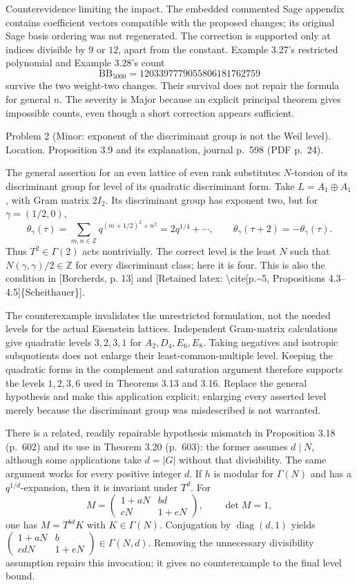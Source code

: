 \documentclass[10pt]{article}
\begin{document}
Counterevidence limiting the impact. The embedded commented Sage appendix contains coefficient vectors compatible with the proposed changes; its original Sage basis ordering was not regenerated. The correction is supported only at indices divisible by \(9\) or \(12\), apart from the constant. Example 3.27’s restricted polynomial and Example 3.28’s count \[\mathrm{BB}_{5000}=1203397779055806181762759\] survive the two weight-two changes. Their survival does not repair the formula for general \(n\). The severity is Major because an explicit principal theorem gives impossible counts, even though a short correction appears sufficient.\par
Problem 2 (Minor: exponent of the discriminant group is not the Weil level).  Location. Proposition 3.9 and its explanation, journal p. 598 (PDF p. 24).\par
The general assertion for an even lattice of even rank substitutes \(N\)-torsion of its discriminant group for level of its quadratic discriminant form. Take \(L=A_1\oplus A_1\), with Gram matrix \(2I_2\). Its discriminant group has exponent two, but for \(\gamma=(1/2,0)\), \[\theta_\gamma(\tau)=\sum_{m,n\in\mathbb Z}q^{(m+1/2)^2+n^2}
 =2q^{1/4}+\cdots,\qquad
 \theta_\gamma(\tau+2)=-\theta_\gamma(\tau).\] Thus \(T^2\in\Gamma(2)\) acts nontrivially. The correct level is the least \(N\) such that \(N(\gamma,\gamma)/2\in\mathbb Z\) for every discriminant class; here it is four. This is also the condition in [Borcherds, p. 13] and [Retained latex: \textbackslash{}cite[p.\textasciitilde{}5, Propositions 4.3--4.5]\{Scheithauer\}].\par
The counterexample invalidates the unrestricted formulation, not the needed levels for the actual Eisenstein lattices. Independent Gram-matrix calculations give quadratic levels \(3,2,3,1\) for \(A_2,D_4,E_6,E_8\). Taking negatives and isotropic subquotients does not enlarge their least-common-multiple level. Keeping the quadratic forms in the complement and saturation argument therefore supports the levels \(1,2,3,6\) used in Theorems 3.13 and 3.16. Replace the general hypothesis and make this application explicit; enlarging every asserted level merely because the discriminant group was misdescribed is not warranted.\par
There is a related, readily repairable hypothesis mismatch in Proposition 3.18 (p. 602) and its use in Theorem 3.20 (p. 603): the former assumes \(d\mid N\), although some applications take \(d=|G|\) without that divisibility. The same argument works for every positive integer \(d\). If \(h\) is modular for \(\Gamma(N)\) and has a \(q^{1/d}\)-expansion, then it is invariant under \(T^d\). For \[M=\begin{pmatrix}1+aN&bd\\cN&1+eN\end{pmatrix},
 \qquad \det M=1,\] one has \(M=T^{bd}K\) with \(K\in\Gamma(N)\). Conjugation by \(\operatorname{diag}(d,1)\) yields \(\left(\begin{smallmatrix}1+aN&b\\cdN&1+eN\end{smallmatrix}\right)\in\Gamma(N,d)\). Removing the unnecessary divisibility assumption repairs this invocation; it gives no counterexample to the final level bound.\par
\end{document}
